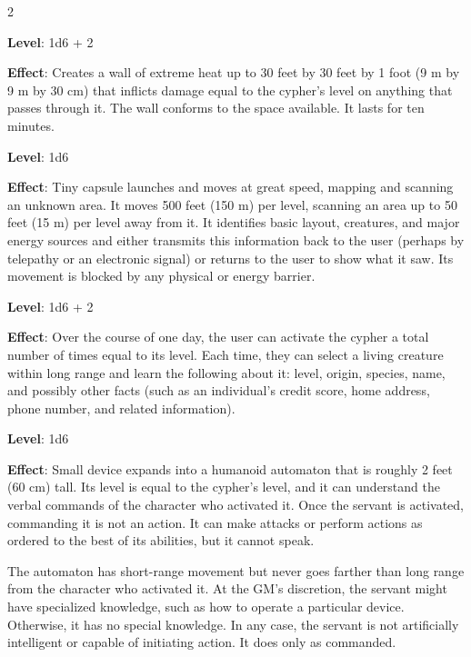 \begin{multicols}{2}


\textbf{Level}: 1d6 + 2

\textbf{Effect}: Creates a wall of extreme heat up to 30 feet by 30 feet by 1 foot (9 m by 9 m by 30 cm) that inflicts damage equal to the cypher’s level on anything that passes through it. The wall conforms to the space available. It lasts for ten minutes.


\textbf{Level}: 1d6

\textbf{Effect}: Tiny capsule launches and moves at great speed, mapping and scanning an unknown area. It moves 500 feet (150 m) per level, scanning an area up to 50 feet (15 m) per level away from it. It identifies basic layout, creatures, and major energy sources and either transmits this information back to the user (perhaps by telepathy or an electronic signal) or returns to the user to show what it saw. Its movement is blocked by any physical or energy barrier.


\textbf{Level}: 1d6 + 2

\textbf{Effect}: Over the course of one day, the user can activate the cypher a total number of times equal to its level. Each time, they can select a living creature within long range and learn the following about it: level, origin, species, name, and possibly other facts (such as an individual’s credit score, home address, phone number, and related information).


\textbf{Level}: 1d6

\textbf{Effect}: Small device expands into a humanoid automaton that is roughly 2 feet (60 cm) tall. Its level is equal to the cypher’s level, and it can understand the verbal commands of the character who activated it. Once the servant is activated, commanding it is not an action. It can make attacks or perform actions as ordered to the best of its abilities, but it cannot speak.

The automaton has short-range movement but never goes farther than long range from the character who activated it. At the GM’s discretion, the servant might have specialized knowledge, such as how to operate a particular device. Otherwise, it has no special knowledge. In any case, the servant is not artificially intelligent or capable of initiating action. It does only as commanded.


\end{multicols}
